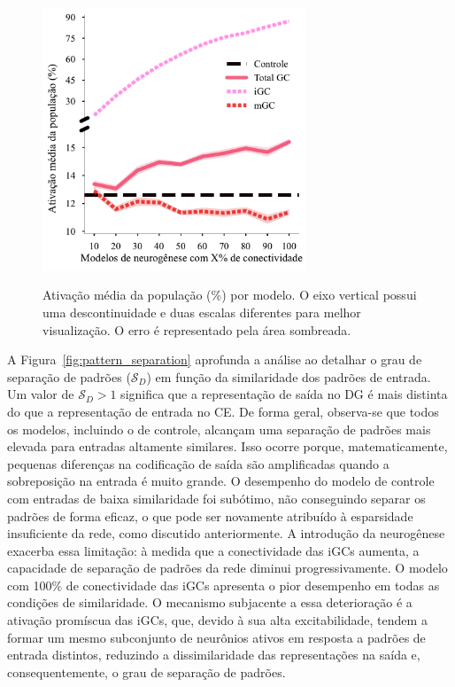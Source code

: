 \begin{figure}[H]
    \centering
    \caption{Ativação média da população (\%) por modelo. O eixo vertical possui uma descontinuidade e duas escalas diferentes para melhor visualização. O erro é representado pela área sombreada.}
    \includegraphics[width=0.7\textwidth]{figuras/plots/avg_activity}
    \label{fig:avg_activity}
\end{figure}


A Figura~\ref{fig:pattern_separation} aprofunda a análise ao detalhar o grau de separação de padrões ($\mathcal{S}_D$) em função
da similaridade dos padrões de entrada. Um valor de $\mathcal{S}_D > 1$ significa que a representação de saída no DG é mais
distinta do que a representação de entrada no CE. De forma geral, observa-se que todos os modelos, incluindo o de controle,
alcançam uma separação de padrões mais elevada para entradas altamente similares. Isso ocorre porque, matematicamente, pequenas
diferenças na codificação de saída são amplificadas quando a sobreposição na entrada é muito grande. O desempenho do modelo de
controle com entradas de baixa similaridade foi subótimo, não conseguindo separar os padrões de forma eficaz, o que pode ser
novamente atribuído à esparsidade insuficiente da rede, como discutido anteriormente. A introdução da neurogênese exacerba essa
limitação: à medida que a conectividade das iGCs aumenta, a capacidade de separação de padrões da rede diminui progressivamente. O
modelo com 100\% de conectividade das iGCs apresenta o pior desempenho em todas as condições de similaridade. O mecanismo
subjacente a essa deterioração é a ativação promíscua das iGCs, que, devido à sua alta excitabilidade, tendem a formar um mesmo
subconjunto de neurônios ativos em resposta a padrões de entrada distintos, reduzindo a dissimilaridade das representações na
saída e, consequentemente, o grau de separação de padrões.

